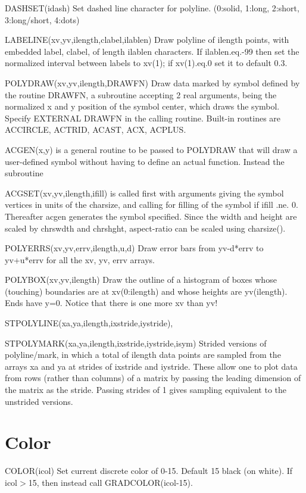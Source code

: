 \documentclass[12pt]{article}
\newif \iftth
\begin{document}
DASHSET(idash) Set dashed line character for polyline. 
(0:solid, 1:long, 2:short, 3:long/short, 4:dots)

LABELINE(xv,yv,ilength,clabel,ilablen) Draw polyline of ilength
points, with embedded label, clabel, of length ilablen characters. If
ilablen.eq.-99 then set the normalized interval between labels to
xv(1); if xv(1).eq.0 set it to default 0.3.

POLYDRAW(xv,yv,ilength,DRAWFN) Draw data marked by symbol defined by
the routine DRAWFN, a subroutine accepting 2 real arguments, being the
normalized x and y position of the symbol center, which draws the symbol.
Specify EXTERNAL DRAWFN in the calling routine. Built-in routines are
ACCIRCLE, ACTRID, ACAST, ACX, ACPLUS.

ACGEN(x,y) is a general routine to be passed to POLYDRAW that will draw a
user-defined symbol without having to define an actual
function. Instead the subroutine 

ACGSET(xv,yv,ilength,ifill) is called
first with arguments giving the symbol vertices in units of the
charsize, and calling for filling of the symbol if ifill .ne. 0.
Thereafter acgen generates the symbol specified. Since the width and
height are scaled by chrswdth and chrshght, aspect-ratio can be scaled
using charsize().

POLYERRS(xv,yv,errv,ilength,u,d) Draw error bars from yv-d*errv to
yv+u*errv for all the xv, yv, errv arrays.

POLYBOX(xv,yv,ilength) Draw the outline of a histogram of boxes whose
(touching) boundaries are at xv(0:ilength) and whose heights are
yv(ilength). Ends have y=0. Notice that there is one more xv than yv!

STPOLYLINE(xa,ya,ilength,ixstride,iystride),

STPOLYMARK(xa,ya,ilength,ixstride,iystride,isym) Strided versions of
polyline/mark, in which a total of ilength data points are sampled
from the arrays xa and ya at strides of ixstride and iystride. These
allow one to plot data from rows (rather than columns) of a matrix by
passing the leading dimension of the matrix as the stride. Passing
strides of 1 gives sampling equivalent to the unstrided versions.

\section{Color}

\iftth \special{html:<a href="filltest.f"><img align="right" src="filltest.png"></a>}\fi
COLOR(icol) Set current discrete color of 0-15. Default 15 black (on
white). If icol$>$15, then instead call GRADCOLOR(icol-15).
\end{document}
